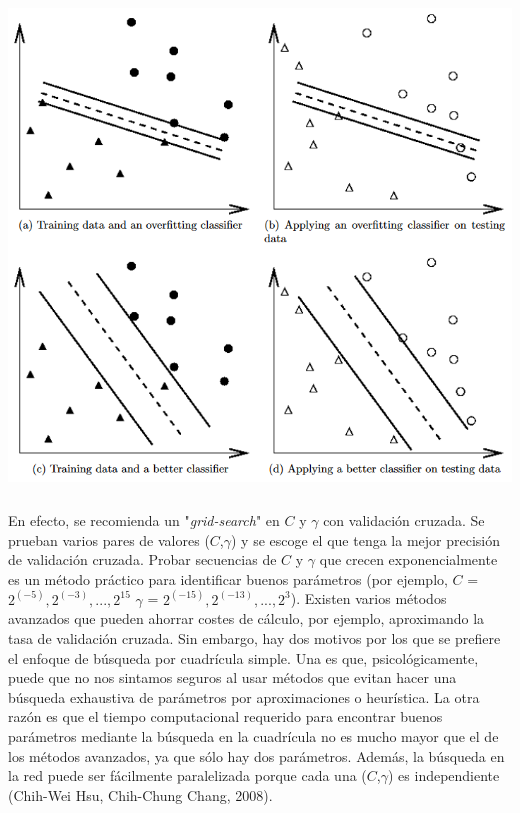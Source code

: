 \begin{center}
\includegraphics[height=5.15in]{figuras/Capture2.PNG}
\end{center}

En efecto, se recomienda un "\textit{grid-search}" en $C$ y $\gamma$ con validación cruzada.  Se prueban varios pares de valores ($C$,$\gamma$) y se escoge el que tenga la mejor precisión de validación cruzada. Probar secuencias de $C$ y $\gamma$ que crecen exponencialmente es un método práctico para identificar buenos parámetros (por ejemplo, $C$ = $2^(-5), 2^(-3), ..., 2^15$ $\gamma$ = $2^(-15), 2^(-13),..., 2^3$). Existen varios métodos avanzados que pueden ahorrar costes de cálculo, por ejemplo, aproximando la tasa de validación cruzada. Sin embargo, hay dos motivos por los que se prefiere el enfoque de búsqueda por cuadrícula simple. Una es que, psicológicamente, puede que no nos sintamos seguros al usar métodos que evitan hacer una búsqueda exhaustiva de parámetros por aproximaciones o heurística.   La otra razón es que el tiempo computacional requerido para encontrar buenos parámetros mediante la búsqueda en la cuadrícula no es mucho mayor que el de los métodos avanzados, ya que sólo hay dos parámetros. Además, la búsqueda en la red puede ser fácilmente paralelizada porque cada una ($C$,$\gamma$) es independiente (Chih-Wei Hsu, Chih-Chung Chang, 2008).

